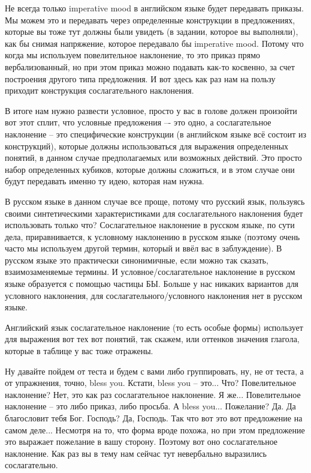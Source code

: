 \documentclass[main.tex]{subfiles}
\begin{document}
Не всегда только imperative mood в английском языке будет передавать приказы.
Мы можем это и передавать через определенные конструкции в предложениях, которые вы тоже тут должны были увидеть (в задании, которое вы выполняли), как бы снимая напряжение, которое передавало бы imperative mood. Потому что когда мы используем повелительное наклонение, то это приказ прямо вербализованный, но при этом приказ можно подавать как-то косвенно, за счет построения другого типа предложения.
И вот здесь как раз нам на пользу приходит конструкция сослагательного наклонения.

В итоге нам нужно развести условное, просто у вас в голове должен произойти вот этот сплит, что условные предложения –- это одно, а сослагательное наклонение -- это специфические конструкции (в английском языке всё состоит из конструкций), которые должны использоваться для выражения определенных понятий, в данном случае предполагаемых или возможных действий.
Это просто набор определенных кубиков, которые должны сложиться, и в этом случае они будут передавать именно ту идею, которая нам нужна.

В русском языке в данном случае все проще, потому что русский язык, пользуясь своими синтетическими характеристиками для сослагательного наклонения будет использовать только что?
Сослагательное наклонение в русском языке, по сути дела, приравнивается, к условному наклонению в русском языке (поэтому очень часто мы используем другой термин, который и ввёл вас в заблуждение).
В русском языке это практически синонимичные, если можно так сказать, взаимозаменяемые термины.
И условное/сослагательное наклонение в русском языке образуется с помощью частицы БЫ.
Больше у нас никаких вариантов для условного наклонения, для сослагательного/условного наклонения нет в русском языке.

Английский язык сослагательное наклонение (то есть особые формы) использует для выражения вот тех вот понятий, так скажем, или оттенков значения глагола, которые в таблице у вас тоже отражены.

Ну давайте пойдем от теста и будем с вами либо группировать, ну, не от теста, а от упражнения, точно, bless you.
Кстати, bless you -- это...
Что?
Повелительное наклонение?
Нет, это как раз сослагательное наклонение.
Я же...
Повелительное наклонение -- это либо приказ, либо просьба.
А bless you...
Пожелание?
Да.
Да благословит тебя Бог.
Господь?
Да, Господь.
Так что вот это вот предложение на самом деле...
Несмотря на то, что форма вроде похожа, но при этом предложение это выражает пожелание в вашу сторону.
Поэтому вот оно сослагательное наклонение.
Как раз вы в тему нам сейчас тут невербально выразились сослагательно.
\end{document}
